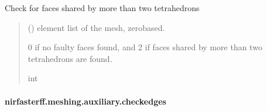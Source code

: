 \documentclass[letterpaper,10pt,english]{sphinxmanual}
\begin{document}
\begin{fulllineitems}
\label{\detokenize{_autosummary/nirfasterff.meshing.auxiliary.check_tetrahedron_faces:nirfasterff.meshing.auxiliary.check_tetrahedron_faces}}
\pysigstartsignatures
\pysiglinewithargsret
{}
{}
{}
\pysigstopsignatures
\sphinxAtStartPar
Check for faces shared by more than two tetrahedrons
\begin{quote}\begin{description}
\sphinxAtStartPar
{} () \textendash{} element list of the mesh, zero\sphinxhyphen{}based.

\sphinxAtStartPar
{} \textendash{} 0 if no faulty faces found, and 2 if faces shared by more than two tetrahedrons are found.

\sphinxAtStartPar
int

\end{description}\end{quote}

\end{fulllineitems}


\sphinxstepscope


\paragraph{nirfasterff.meshing.auxiliary.checkedges}
\label{\detokenize{_autosummary/nirfasterff.meshing.auxiliary.checkedges:nirfasterff-meshing-auxiliary-checkedges}}\label{\detokenize{_autosummary/nirfasterff.meshing.auxiliary.checkedges::doc}}
\end{document}
